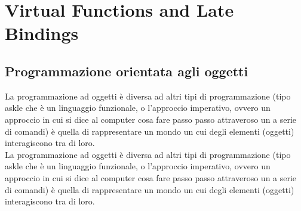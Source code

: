 \chapter{Virtual Functions and Late Bindings}
\section{Programmazione orientata agli oggetti}
La programmazione ad oggetti è diversa ad altri tipi di programmazione (tipo askle che è un linguaggio funzionale, o l'approccio imperativo, ovvero  un approccio in cui si dice al computer cosa fare passo passo attraveroso un a serie di comandi) è quella di rappresentare un mondo un cui degli elementi (oggetti) interagiscono tra di loro. \\

La programmazione ad oggetti è diversa ad altri tipi di programmazione (tipo askle che è un linguaggio funzionale, o l'approccio imperativo, ovvero  un approccio in cui si dice al computer cosa fare passo passo attraveroso un a serie di comandi) è quella di rappresentare un mondo un cui degli elementi (oggetti) interagiscono tra di loro. \\


